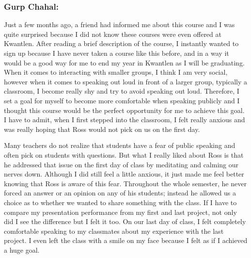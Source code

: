 \documentclass[letterpaper,10pt,headsepline]{scrreprt}
\begin{document}
\subsubsection{Gurp Chahal:}

Just a few months ago, a friend had informed me about this course and I was quite surprised because I did not know these courses were even offered at Kwantlen. After reading a brief description of the course, I instantly wanted to sign up because I have never taken a course like this before, and in a way it would be a good way for me to end my year in Kwantlen as I will be graduating. When it comes to interacting with smaller groups, I think I am very social, however when it comes to speaking out loud in front of a larger group, typically a classroom, I become really shy and try to avoid speaking out loud. Therefore, I set a goal for myself to become more comfortable when speaking publicly and I thought this course would be the perfect opportunity for me to achieve this goal. I have to admit, when I first stepped into the classroom, I felt really anxious and was really hoping that Ross would not pick on us on the first day.

Many teachers do not realize that students have a fear of public speaking and often pick on students with questions. But what I really liked about Ross is that he addressed that issue on the first day of class by meditating and calming our nerves down. Although I did still feel a little anxious, it just made me feel better knowing that Ross is aware of this fear. Throughout the whole semester, he never forced an answer or an opinion on any of his students; instead he allowed us a choice as to whether we wanted to share something with the class. If I have to compare my presentation performance from my first and last project, not only did I see the difference but I felt it too. On our last day of class, I felt completely comfortable speaking to my classmates about my experience with the last project. I even left the class with a smile on my face because I felt as if I achieved a huge goal.
\end{document}
